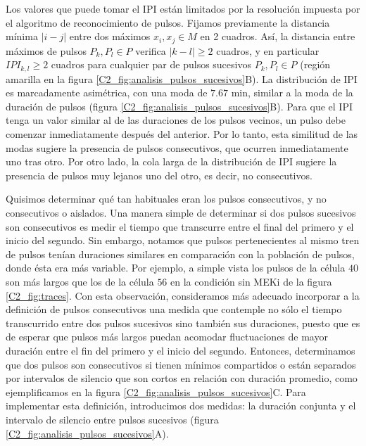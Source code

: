 \documentclass[./main.tex]{subfiles}
\begin{document}
Los valores que puede tomar el IPI están limitados por la resolución impuesta por el algoritmo de reconocimiento de pulsos. Fijamos previamente la distancia mínima $|i-j|$ entre dos máximos $x_i, x_j \in M$ en 2 cuadros. Así, la distancia entre máximos de pulsos $P_k, P_l \in P$ verifica $ |k-l| \geq 2$ cuadros, y en particular $IPI_{k,l} \geq 2$ cuadros para cualquier par de pulsos sucesivos $P_k,P_l \in P$ (región amarilla en la figura \ref{C2_fig:analisis_pulsos_sucesivos}B). La distribución de IPI es marcadamente asimétrica, con una moda de $7.67$ min, similar a la moda de la duración de pulsos (figura \ref{C2_fig:analisis_pulsos_sucesivos}B). Para que el IPI tenga un valor similar al de las duraciones de los pulsos vecinos, un pulso debe comenzar inmediatamente después del anterior. Por lo tanto, esta similitud de las modas sugiere la presencia de pulsos consecutivos, que ocurren inmediatamente uno tras otro. Por otro lado, la cola larga de la distribución de IPI sugiere la presencia de pulsos muy lejanos uno del otro, es decir, no consecutivos.


Quisimos determinar qué tan habituales eran los pulsos consecutivos, y no consecutivos o aislados. Una manera simple de determinar si dos pulsos sucesivos son consecutivos es medir el tiempo que transcurre entre el final del primero y el inicio del segundo. Sin embargo, notamos que pulsos pertenecientes al mismo tren de pulsos tenían duraciones similares en comparación con la población de pulsos, donde ésta era más variable. Por ejemplo, a simple vista los pulsos de la célula $40$ son más largos que los de la célula $56$ en la condición sin MEKi de la figura \ref{C2_fig:traces}. Con esta observación, consideramos más adecuado incorporar a la definición de pulsos consecutivos una medida que contemple no sólo el tiempo transcurrido entre dos pulsos sucesivos sino también sus duraciones, puesto que es de esperar que pulsos más largos puedan acomodar fluctuaciones de mayor duración entre el fin del primero y el inicio del segundo. Entonces, determinamos que dos pulsos son consecutivos si tienen mínimos compartidos o están separados por intervalos de silencio que son cortos en relación con duración promedio, como ejemplificamos en la figura  \ref{C2_fig:analisis_pulsos_sucesivos}C. Para implementar esta definición, introducimos dos medidas: la duración conjunta y el intervalo de silencio entre pulsos sucesivos (figura \ref{C2_fig:analisis_pulsos_sucesivos}A).
\end{document}
